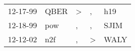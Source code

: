 \begin{supertabular}{p{0.07\textwidth}p{0.06\textwidth}p{0.02\textwidth}p{0.02\textwidth}p{0.06\textwidth}}
 12-17-99\textsuperscript{} &  QBER\textsuperscript{} &  \textgreater &             , &   h19\textsuperscript{} \\
 12-18-99\textsuperscript{} &   pow\textsuperscript{} &             , &             , &  SJIM\textsuperscript{} \\
 12-12-02\textsuperscript{} &   n2f\textsuperscript{} &             , &  \textgreater &  WALY\textsuperscript{} \\
\end{supertabular}
